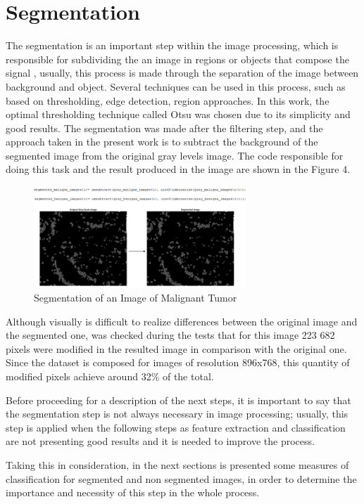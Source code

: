 \documentclass[conference]{IEEEtran}
\begin{document}
\section{Segmentation}
The segmentation is an important step within the image processing, which is responsible for subdividing the an image in regions or objects that compose the signal \cite{Gonzalez:2006:DIP:1076432}, usually, this process is made through the separation of the image between background and object. Several techniques can be used in this process, such as based on thresholding, edge detection, region approaches. In this work, the optimal thresholding technique called Otsu was chosen due to its simplicity and good results. The segmentation was made after the filtering step, and the approach taken in the present work is to subtract the background of the segmented image from the original gray levels image. The code responsible for doing this task and the result produced in the image are shown in the Figure 4.

\begin{figure}[h]
    \centering
    \includegraphics[width=8cm]{images/imagem_segmentacao.png}
    \caption{Segmentation of an Image of Malignant Tumor}
    \label{fig:imagem_segmentacao}
\end{figure}

Although visually is difficult to realize differences between the original image and the segmented one, was checked during the tests that for this image 223 682 pixels were modified in the resulted image in comparison with the original one. Since the dataset is composed for images of resolution 896x768, this quantity of modified pixels achieve around 32\% of the total.\par
Before proceeding for a description of the next steps, it is important to say that the segmentation step is not always necessary in image processing; usually, this step is applied when the following steps as feature extraction and classification are not presenting good results and it is needed to improve the process.\par
Taking this in consideration, in the next sections is presented some measures of classification for segmented and non segmented images, in order to determine the importance and necessity of this step in the whole process.
\end{document}
